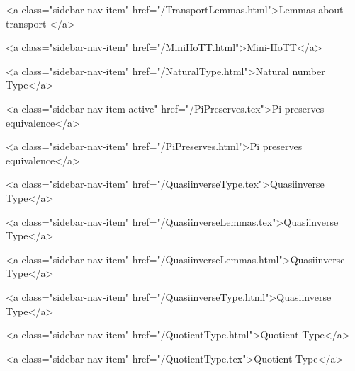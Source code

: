       
        
          <a class="sidebar-nav-item" href="/TransportLemmas.html">Lemmas about transport </a>
        
      
    
      
        
          <a class="sidebar-nav-item" href="/MiniHoTT.html">Mini-HoTT</a>
        
      
    
      
        
          <a class="sidebar-nav-item" href="/NaturalType.html">Natural number Type</a>
        
      
    
      
        
          <a class="sidebar-nav-item active" href="/PiPreserves.tex">Pi preserves equivalence</a>
        
      
    
      
        
          <a class="sidebar-nav-item" href="/PiPreserves.html">Pi preserves equivalence</a>
        
      
    
      
        
          <a class="sidebar-nav-item" href="/QuasiinverseType.tex">Quasiinverse Type</a>
        
      
    
      
        
          <a class="sidebar-nav-item" href="/QuasiinverseLemmas.tex">Quasiinverse Type</a>
        
      
    
      
        
          <a class="sidebar-nav-item" href="/QuasiinverseLemmas.html">Quasiinverse Type</a>
        
      
    
      
        
          <a class="sidebar-nav-item" href="/QuasiinverseType.html">Quasiinverse Type</a>
        
      
    
      
        
          <a class="sidebar-nav-item" href="/QuotientType.html">Quotient Type</a>
        
      
    
      
        
          <a class="sidebar-nav-item" href="/QuotientType.tex">Quotient Type</a>
        
